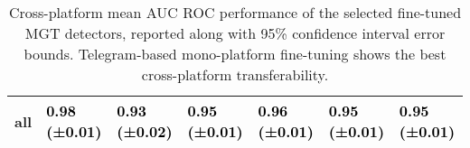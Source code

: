 \documentclass[letterpaper]{article} %
\begin{document}
\begin{table}[!t]
{\begin{tabular}{l|p{1.5cm}p{1.5cm}p{1.5cm}p{1.5cm}p{1.8cm}|p{1.2cm}}
\hline
\bfseries all & {\cellcolor[HTML]{7EADD1}} \textcolor{black}{0.98 (±0.01)} & {\cellcolor[HTML]{8FB4D6}} \textcolor{black}{0.93 (±0.02)} & {\cellcolor[HTML]{89B1D4}} \textcolor{black}{0.95 (±0.01)} & {\cellcolor[HTML]{83AFD3}} \textcolor{black}{0.96 (±0.01)} & {\cellcolor[HTML]{86B0D3}} \textcolor{black}{0.95 (±0.01)} & {\cellcolor[HTML]{86B0D3}} \textcolor{black}{\bfseries 0.95 (±0.01)} \\
\hline
\end{tabular}
}
\caption{Cross-platform mean AUC ROC performance of the selected fine-tuned MGT detectors, reported along with 95\% confidence interval error bounds. Telegram-based mono-platform fine-tuning shows the best cross-platform transferability.}
\label{tab:crossplatform}
\end{table}
\end{document}
